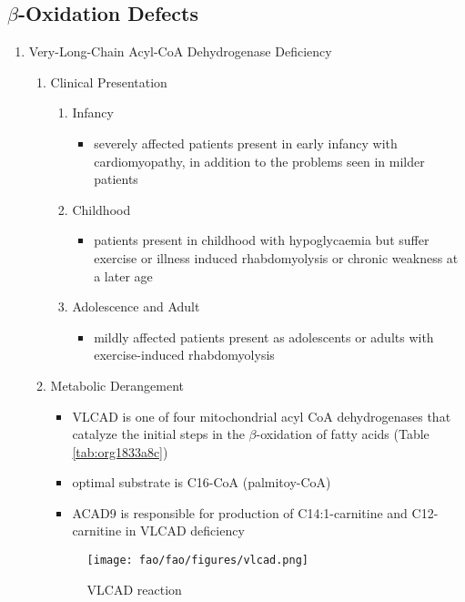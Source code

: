 \documentclass{scrartcl}
\begin{document}
\subsection{\(\beta\)-Oxidation Defects}
\label{sec:org126fe57}
\begin{enumerate}
\item Very-Long-Chain Acyl-CoA Dehydrogenase Deficiency
\label{sec:org56b4af7}
\begin{enumerate}
\item Clinical Presentation
\label{sec:orgae062b1}
\begin{enumerate}
\item Infancy
\label{sec:orgd94d6b3}
\begin{itemize}
\item severely affected patients present in early infancy with
cardiomyopathy, in addition to the problems seen in milder patients
\end{itemize}
\item Childhood
\label{sec:orgbb388b6}
\begin{itemize}
\item patients present in childhood with hypoglycaemia but suffer exercise
or illness induced rhabdomyolysis or chronic weakness at a later age
\end{itemize}
\item Adolescence and Adult
\label{sec:org69ff65a}
\begin{itemize}
\item mildly affected patients present as adolescents or adults with
exercise-induced rhabdomyolysis
\end{itemize}
\end{enumerate}
\item Metabolic Derangement
\label{sec:orgf85f39c}
\begin{itemize}
\item VLCAD is one of four mitochondrial acyl CoA dehydrogenases that
catalyze the initial steps in the \(\beta\)-oxidation of fatty acids
(Table \ref{tab:org1833a8c})
\item optimal substrate is C16-CoA (palmitoy-CoA)
\item ACAD9 is responsible for production of C14:1-carnitine and
C12-carnitine in VLCAD deficiency
\end{itemize}
\begin{figure}[htbp]
\centering
\texttt{[image: fao/fao/figures/vlcad.png]}
\caption{\label{fig:orgcbde85b}VLCAD reaction}
\end{figure}


\end{enumerate}
\end{enumerate}
\end{document}
